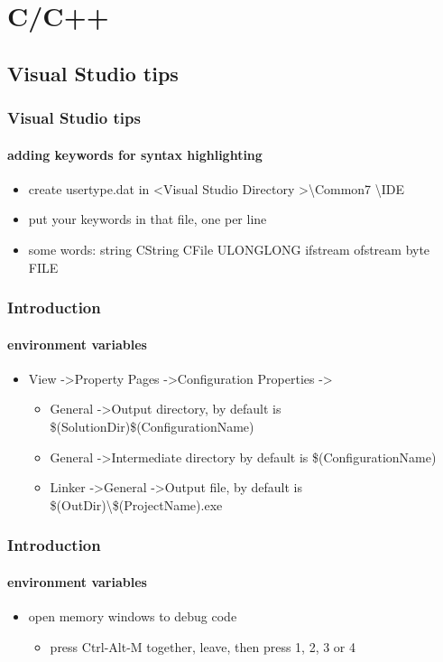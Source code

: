 \section{C/C++}
\subsection{Visual Studio tips}
\begin{frame}
\frametitle{Visual Studio tips}
\framesubtitle{adding keywords for syntax highlighting}
\logoCSIPCPL\mypagenum	
	\begin{itemize}
		\item create usertype.dat in \textless Visual Studio Directory \textgreater  \textbackslash Common7 \textbackslash IDE
		\item put your keywords in that file, one per line
		\item some words: string CString CFile ULONGLONG ifstream ofstream byte FILE
	\end{itemize}
\end{frame}


\begin{frame}
\frametitle{Introduction}
\framesubtitle{environment variables}
\logoCSIPCPL\mypagenum
	\begin{itemize}\tiny	
		\item View -\textgreater Property Pages -\textgreater Configuration Properties -\textgreater  
			\begin{itemize}\tiny
				\item General -\textgreater Output directory, by default is \$(SolutionDir)\$(ConfigurationName)	
				\item General -\textgreater Intermediate directory by default is \$(ConfigurationName)
				\item Linker -\textgreater General -\textgreater Output file, by default is \$(OutDir)\textbackslash \$(ProjectName).exe	
			\end{itemize}
	\end{itemize}
\end{frame}



\begin{frame}
\frametitle{Introduction}
\framesubtitle{environment variables}
\logoCSIPCPL\mypagenum
	\begin{itemize}
		\item open memory windows to debug code
			\begin{itemize}
				\item press Ctrl-Alt-M together, leave, then press 1, 2, 3 or 4
			\end{itemize}
	\end{itemize}
\end{frame}




